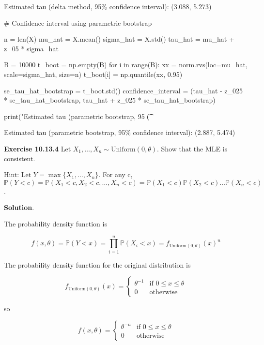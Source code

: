 \begin{console}
Estimated tau (delta method, 95\% confidence interval):   (3.088, 5.273)
\end{console}

\begin{python}
# Confidence interval using parametric bootstrap

n = len(X)
mu_hat = X.mean()
sigma_hat = X.std()
tau_hat = mu_hat + z_{0}5 * sigma_hat

B = 10000
t_boot = np.empty(B)
for i in range(B):
    xx = norm.rvs(loc=mu_hat, scale=sigma_hat, size=n)
    t_boot[i] = np.quantile(xx, 0.95)
    
se_tau_hat_bootstrap = t_boot.std()
confidence_{i}nterval = (tau_hat - z_{0}25 * se_tau_hat_bootstrap, 
                         tau_hat + z_{0}25 * se_tau_hat_bootstrap)

print("Estimated tau (parametric bootstrap, 95%
      \t (%
\end{python}

\begin{console}
Estimated tau (parametric bootstrap, 95\% confidence interval):   (2.887, 5.474)
\end{console}

\textbf{Exercise 10.13.4} Let
\(X_{1}, \dots, X_{n} \sim \text{Uniform}(0, \theta)\). Show that the MLE is
consistent.

Hint: Let \(Y = \max \{ X_{1}, \dots, X_{n} \}\). For any c,
\(\mathbb{P}(Y < c) = \mathbb{P}(X_{1} < c, X_{2} < c, \dots, X_{n} < c) = \mathbb{P}(X_{1} < c)\mathbb{P}(X_{2} < c)\dots\mathbb{P}(X_{n} < c)\).

\textbf{Solution}.

The probability density function is

\[ f(x, \theta) = \mathbb{P}(Y < x) = \prod_{i = 1}^{n} \mathbb{P}(X_{i} < x) = f_{\text{Uniform}(0, \theta)}(x)^{n} \]

The probability density function for the original distribution is

\[ f_{\text{Uniform}(0, \theta)}(x) = \begin{cases}
\theta^{-1} & \text{if } 0 \leq x \leq \theta \\
0 & \text{otherwise}
\end{cases}
\]

so

\[ f(x, \theta) = \begin{cases}
\theta^{-n} & \text{if } 0 \leq x \leq \theta \\
0 & \text{otherwise}
\end{cases}
\]

